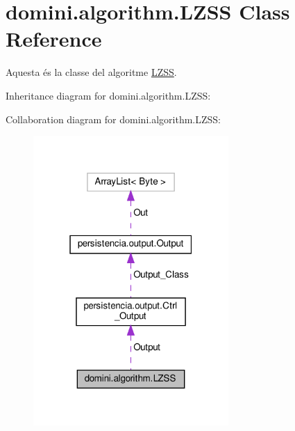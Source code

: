\hypertarget{classdomini_1_1algorithm_1_1LZSS}{}\section{domini.\+algorithm.\+L\+Z\+SS Class Reference}
\label{classdomini_1_1algorithm_1_1LZSS}


Aquesta és la classe del algoritme \hyperlink{classdomini_1_1algorithm_1_1LZSS}{L\+Z\+SS}.  




Inheritance diagram for domini.\+algorithm.\+L\+Z\+SS\+:


Collaboration diagram for domini.\+algorithm.\+L\+Z\+SS\+:\nopagebreak
\begin{figure}[H]
\begin{center}
\leavevmode
\includegraphics[width=211pt]{classdomini_1_1algorithm_1_1LZSS__coll__graph}
\end{center}
\end{figure}
